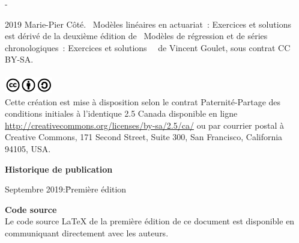 \begingroup
\calccentering{\unitlength}
\begin{adjustwidth*}{\unitlength}{-\unitlength}
  \small
  \setlength{\parindent}{0pt}
  \setlength{\parskip}{\baselineskip}

  {\textcopyright} 2019 Marie-Pier Côté. \og~Modèles linéaires en actuariat~: Exercices et solutions~\fg~ est dérivé de la deuxième édition de \og~Modèles de régression et de séries chronologiques~: Exercices et solutions~\fg~ de Vincent Goulet, sous contrat CC BY-SA. \\
\\

  \raisebox{-1pt} \includegraphics[height=7mm,keepaspectratio=true]{cc-by-sa.jpg} \\  
  Cette création est mise à disposition selon le contrat
  Paternité-Partage des conditions initiales à l'identique 2.5 Canada
  disponible en ligne
  \url{http://creativecommons.org/licenses/by-sa/2.5/ca/} ou par
  courrier postal à Creative Commons, 171 Second Street, Suite 300,
  San Francisco, California 94105, USA.


  \textbf{Historique de publication}
  \vspace{-\baselineskip}
  \begin{tabbing}
   
    Septembre 2019:\quad\= Première édition 
  \end{tabbing}

  \textbf{Code source} \\
  Le code source {\LaTeX} de la première édition de ce document est disponible en communiquant directement avec les auteurs.

\end{adjustwidth*}
\endgroup

\renewcommand{\sfdefault}{phv}

\clearpage


